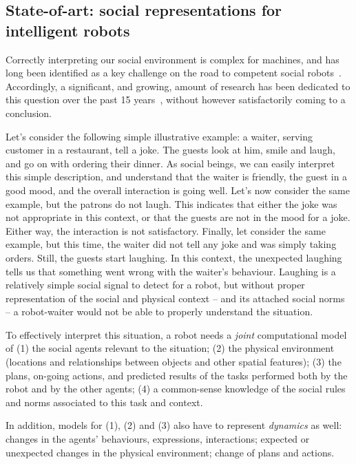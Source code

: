 \subsection{State-of-art: social representations for intelligent robots}

Correctly interpreting our social environment is complex for machines, and has
long been identified as a key challenge on the road to competent social
robots~\cite{yang2018grand}. Accordingly, a significant, and growing, amount of
research has been dedicated to this question over the past 15
years~\cite{bartneck2020human}, without however satisfactorily coming to a
conclusion.

Let's consider the following simple illustrative example: a waiter, serving
customer in a restaurant, tell a joke. The guests look at him, smile and laugh,
and go on with ordering their dinner. As social beings, we can easily interpret
this simple description, and understand that the waiter is friendly, the guest
in a good mood, and the overall interaction is going well. Let's now consider
the same example, but the patrons do not laugh. This indicates that either the
joke was not appropriate in this context, or that the guests are not in the mood
for a joke. Either way, the interaction is not satisfactory. Finally, let
consider the same example, but this time, the waiter did not tell any joke and
was simply taking orders. Still, the guests start laughing. In this context, the
unexpected laughing tells us that something went wrong with the waiter's
behaviour.  Laughing is a relatively simple social signal to detect for a robot,
but without proper representation of the social and physical context -- and its
attached social norms -- a robot-waiter would not be able to properly understand
the situation.

To effectively interpret this situation, a robot needs a \emph{joint}
computational model of (1) the social agents relevant to the situation; (2) the
physical environment (locations and relationships between objects and other
spatial features); (3) the plans, on-going actions, and predicted results of the
tasks performed both by the robot and by the other agents; (4) a common-sense
knowledge of the social rules and norms associated to this task and context.

In addition, models for (1), (2) and (3) also have to represent \emph{dynamics} as
well: changes in the agents' behaviours, expressions, interactions; expected or
unexpected changes in the physical environment; change of plans and actions.

